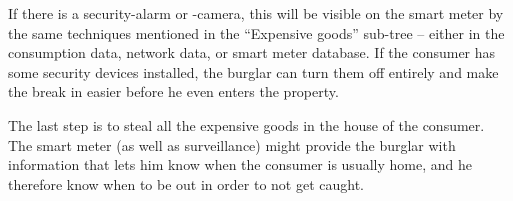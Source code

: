 If there is a security-alarm or -camera, this will be visible on the smart meter by the same techniques mentioned in the ``Expensive goods'' sub-tree -- either in the consumption data, network data, or smart meter database.
If the consumer has some security devices installed, the burglar can turn them off entirely and make the break in easier before he even enters the property.

The last step is to steal all the expensive goods in the house of the consumer.
The smart meter (as well as surveillance) might provide the burglar with information that lets him know when the consumer is usually home, and he therefore know when to be out in order to not get caught.
